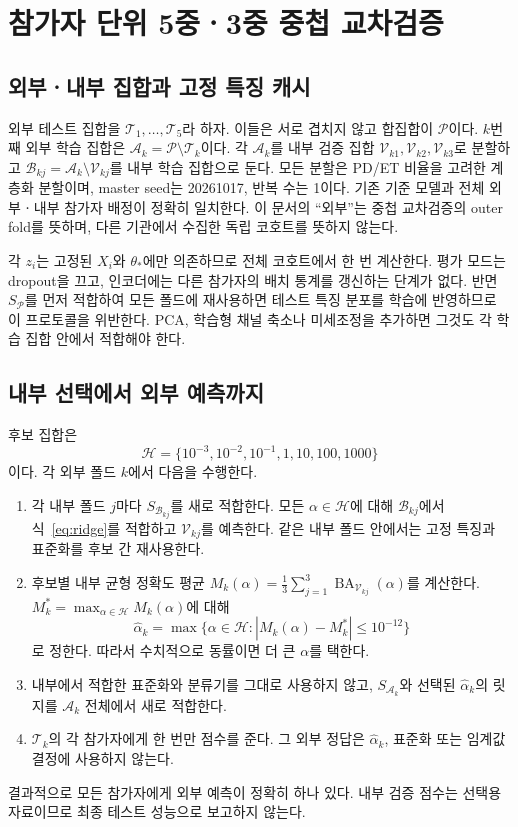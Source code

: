 \documentclass[11pt,a4paper]{article}
\DeclareMathOperator{\BA}{BA}
\numberwithin{equation}{section}
\begin{document}
\section{참가자 단위 5중ㆍ3중 중첩 교차검증}
\subsection{외부ㆍ내부 집합과 고정 특징 캐시}
외부 테스트 집합을 $\mathcal T_1,\ldots,\mathcal T_5$라 하자.
이들은 서로 겹치지 않고 합집합이 $\mathcal P$이다.
$k$번째 외부 학습 집합은 $\mathcal A_k=\mathcal P\setminus\mathcal T_k$이다.
각 $\mathcal A_k$를 내부 검증 집합
$\mathcal V_{k1},\mathcal V_{k2},\mathcal V_{k3}$로 분할하고
$\mathcal B_{kj}=\mathcal A_k\setminus\mathcal V_{kj}$를 내부 학습 집합으로 둔다.
모든 분할은 PD/ET 비율을 고려한 계층화 분할이며,
master seed는 20261017, 반복 수는 1이다.
기존 기준 모델과 전체 외부ㆍ내부 참가자 배정이 정확히 일치한다.
이 문서의 ``외부''는 중첩 교차검증의 outer fold를 뜻하며,
다른 기관에서 수집한 독립 코호트를 뜻하지 않는다.

각 $z_i$는 고정된 $X_i$와 $\theta_*$에만 의존하므로 전체 코호트에서 한 번 계산한다.
평가 모드는 dropout을 끄고, 인코더에는 다른 참가자의 배치 통계를 갱신하는 단계가 없다.
반면 $S_{\mathcal P}$를 먼저 적합하여 모든 폴드에 재사용하면
테스트 특징 분포를 학습에 반영하므로 이 프로토콜을 위반한다.
PCA, 학습형 채널 축소나 미세조정을 추가하면 그것도 각 학습 집합 안에서 적합해야 한다.

\subsection{내부 선택에서 외부 예측까지}
후보 집합은
\begin{equation}
 \mathcal H=\{10^{-3},10^{-2},10^{-1},1,10,100,1000\}
\end{equation}
이다. 각 외부 폴드 $k$에서 다음을 수행한다.
\begin{enumerate}
\item 각 내부 폴드 $j$마다 $S_{\mathcal B_{kj}}$를 새로 적합한다.
모든 $\alpha\in\mathcal H$에 대해 $\mathcal B_{kj}$에서 식~\eqref{eq:ridge}를 적합하고
$\mathcal V_{kj}$를 예측한다. 같은 내부 폴드 안에서는 고정 특징과 표준화를 후보 간 재사용한다.
\item 후보별 내부 균형 정확도 평균
$M_k(\alpha)=\frac13\sum_{j=1}^{3}\BA_{\mathcal V_{kj}}(\alpha)$를 계산한다.
$M_k^*=\max_{\alpha\in\mathcal H}M_k(\alpha)$에 대해
\begin{equation}
 \widehat\alpha_k=\max\{\alpha\in\mathcal H:
 |M_k(\alpha)-M_k^*|\le10^{-12}\}
\end{equation}
로 정한다. 따라서 수치적으로 동률이면 더 큰 $\alpha$를 택한다.
\item 내부에서 적합한 표준화와 분류기를 그대로 사용하지 않고,
$S_{\mathcal A_k}$와 선택된 $\widehat\alpha_k$의 릿지를
$\mathcal A_k$ 전체에서 새로 적합한다.
\item $\mathcal T_k$의 각 참가자에게 한 번만 점수를 준다.
그 외부 정답은 $\widehat\alpha_k$, 표준화 또는 임계값 결정에 사용하지 않는다.
\end{enumerate}
결과적으로 모든 참가자에게 외부 예측이 정확히 하나 있다.
내부 검증 점수는 선택용 자료이므로 최종 테스트 성능으로 보고하지 않는다.
\end{document}
